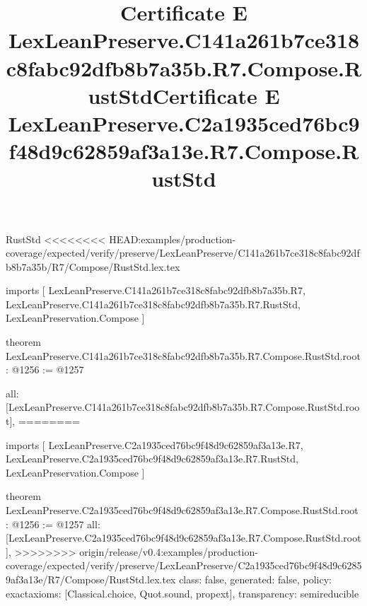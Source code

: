 \begin{lexlean}{RustStd}
<<<<<<<< HEAD:examples/production-coverage/expected/verify/preserve/LexLeanPreserve/C141a261b7ce318c8fabc92dfb8b7a35b/R7/Compose/RustStd.lex.tex
\title{Certificate E LexLeanPreserve.C141a261b7ce318c8fabc92dfb8b7a35b.R7.Compose.RustStd}
\begin{coremodule}
imports [
  LexLeanPreserve.C141a261b7ce318c8fabc92dfb8b7a35b.R7,
  LexLeanPreserve.C141a261b7ce318c8fabc92dfb8b7a35b.R7.RustStd,
  LexLeanPreservation.Compose
]

theorem LexLeanPreserve.C141a261b7ce318c8fabc92dfb8b7a35b.R7.Compose.RustStd.root : @1256 := @1257 {
  all: [LexLeanPreserve.C141a261b7ce318c8fabc92dfb8b7a35b.R7.Compose.RustStd.root],
========
\title{Certificate E LexLeanPreserve.C2a1935ced76bc9f48d9c62859af3a13e.R7.Compose.RustStd}
\begin{coremodule}
imports [
  LexLeanPreserve.C2a1935ced76bc9f48d9c62859af3a13e.R7,
  LexLeanPreserve.C2a1935ced76bc9f48d9c62859af3a13e.R7.RustStd,
  LexLeanPreservation.Compose
]

theorem LexLeanPreserve.C2a1935ced76bc9f48d9c62859af3a13e.R7.Compose.RustStd.root : @1256 := @1257 {
  all: [LexLeanPreserve.C2a1935ced76bc9f48d9c62859af3a13e.R7.Compose.RustStd.root],
>>>>>>>> origin/release/v0.4:examples/production-coverage/expected/verify/preserve/LexLeanPreserve/C2a1935ced76bc9f48d9c62859af3a13e/R7/Compose/RustStd.lex.tex
  class: false,
  generated: false,
  policy: exact{axioms: [Classical.choice, Quot.sound, propext]},
  transparency: semireducible
}


\end{coremodule}}
\end{coremodule}
\end{lexlean}
